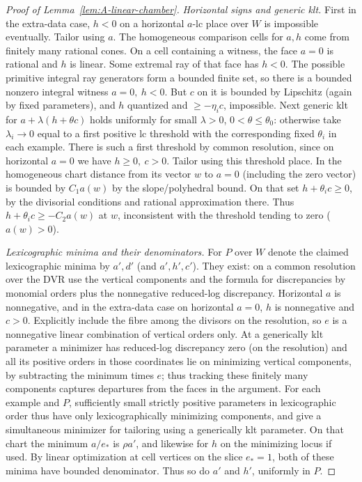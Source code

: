\begin{proof}[Proof of Lemma~\ref{lem:A-linear-chamber}]
\emph{Horizontal signs and generic klt.}
First in the extra-data case, \(h<0\) on a horizontal \(a\)-lc place over \(W\) is impossible eventually.
Tailor using \(a\).  The homogeneous comparison cells for \(a,h\)
come from finitely many rational cones.  On a cell containing a
witness, the face \(a=0\) is rational and \(h\) is linear.
Some extremal ray of that face has \(h<0\).  The possible primitive
integral ray generators form a bounded finite set, so there is a
bounded nonzero integral witness \(a=0,\ h<0\).
But \(c\) on it is bounded by Lipschitz (again by fixed parameters), and \(h\) quantized and \(\ge-\eta_i c\), impossible.
Next generic klt for \(a+\lambda(h+\theta c)\) holds uniformly for small \(\lambda>0\), \(0<\theta\le\theta_0\): otherwise take \(\lambda_i\to0\) equal to a first positive lc threshold with the corresponding fixed \(\theta_i\) in each example.
There is such a first threshold by common resolution, since on horizontal \(a=0\) we have \(h\ge0,\ c>0\).
Tailor using this threshold place.
In the homogeneous chart distance from its vector \(w\) to \(a=0\) (including the zero vector) is bounded by \(C_1 a(w)\) by the slope/polyhedral bound.
On that set \(h+\theta_i c\ge0\), by the divisorial conditions and rational approximation there.
Thus \(h+\theta_i c\ge-C_2 a(w)\) at \(w\), inconsistent with the threshold tending to zero (\(a(w)>0\)).

\emph{Lexicographic minima and their denominators.}
For \(P\) over \(W\) denote the claimed lexicographic minima by \(a',d'\) (and \(a',h',c'\)).
They exist: on a common resolution over the DVR use the vertical components and the formula for discrepancies by monomial orders plus the nonnegative reduced-log discrepancy.
Horizontal \(a\) is nonnegative, and in the extra-data case on horizontal \(a=0\), \(h\) is nonnegative and \(c>0\).
Explicitly include the fibre among the divisors on the resolution, so \(e\) is a nonnegative linear combination of vertical orders only.
At a generically klt parameter a minimizer has reduced-log discrepancy zero (on the resolution) and all its positive orders in those coordinates lie on minimizing vertical components, by subtracting the minimum times \(e\); thus tracking these finitely many components captures departures from the faces in the argument.
For each example and \(P\), sufficiently small strictly positive parameters in lexicographic order thus have only lexicographically minimizing components, and give a simultaneous minimizer for tailoring using a generically klt parameter.
On that chart the minimum \(a/e_*\) is \(\rho a'\), and likewise for \(h\) on the minimizing locus if used.
By linear optimization at cell vertices on the slice \(e_*=1\), both of these minima have bounded denominator.
Thus so do \(a'\) and \(h'\), uniformly in \(P\).


\end{proof}
